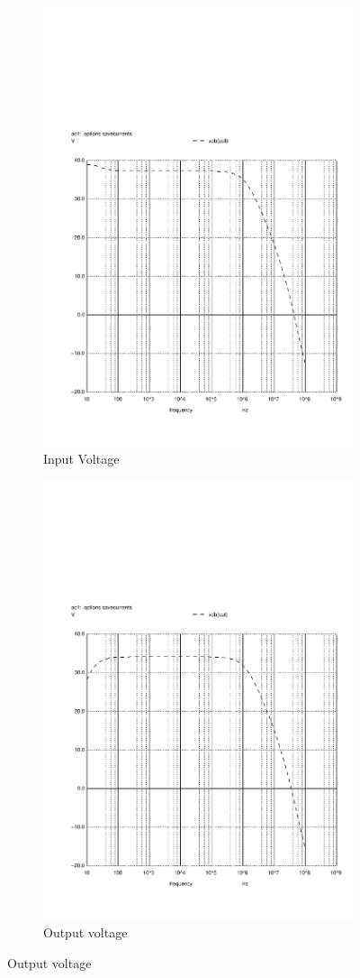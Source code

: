 \begin{figure}[H]
\centering
\begin{subfigure}{.5\textwidth}
  \centering
  \includegraphics[width=.75\linewidth]{vo1f.pdf}
  \caption{Input Voltage}
  \label{fig:sim4}
\end{subfigure}%
\begin{subfigure}{.5\textwidth}
  \centering
  \includegraphics[width=.75\linewidth]{vo2f.pdf}
  \caption{Output voltage}
  \label{fig:sim5}
\end{subfigure}
\end{figure}

